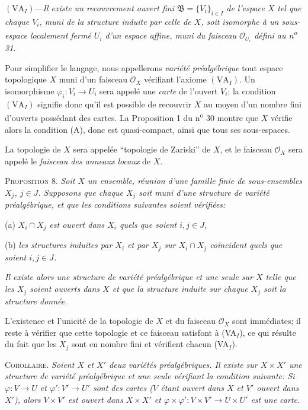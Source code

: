 $(\mathrm{VA}_I)$---\textit{Il existe un recouvrement ouvert fini $\mathfrak{B} = \{V_i\}_{i \in I}$ de l'espace $X$ tel que chaque $V_i$, muni de la structure induite par celle de $X$, soit isomorphe à un sous-espace localement fermé $U_i$ d'un espace affine, muni du faisceau $\mathcal{O}_{U_i}$ défini au n\textsuperscript{o} 31.}

Pour simplifier le langage, nous appellerons \textit{variété préalgébrique} tout espace topologique $X$ muni d'un faisceau $\mathcal{O}_X$ vérifiant l'axiome $(\mathrm{VA}_I)$. Un isomorphisme $\varphi_i\colon V_i \to U_i$ sera appelé une \textit{carte} de l'ouvert $V_i$; la condition $(\mathrm{VA}_I)$ signifie donc qu'il est possible de recouvrir $X$ au moyen d'un nombre fini d'ouverts possédant des cartes. La Proposition 1 du n\textsuperscript{o} 30 montre que $X$ vérifie alors la condition (A), donc est quasi-compact, ainsi que tous ses sous-espaces.



La topologie de $X$ sera appelée ``topologie de Zariski'' de $X$, et le faisceau $\mathcal{O}_X$ sera appelé le \textit{faisceau des anneaux locaux} de $X$.

\textsc{Proposition} 8. \textit{Soit $X$ un ensemble, réunion d'une famille finie de sous-ensembles $X_j$, $j \in J$. Supposons que chaque $X_j$ soit muni d'une structure de variété préalgébrique, et que les conditions suivantes soient vérifiées:}

(a) \textit{$X_i \cap X_j$ est ouvert dans $X_i$ quels que soient $i, j \in J$,}

(b) \textit{les structures induites par $X_i$ et par $X_j$ sur $X_i \cap X_j$ coïncident quels que soient $i, j \in J$.}

\textit{Il existe alors une structure de variété préalgébrique et une seule sur $X$ telle que les $X_j$ soient ouverts dans $X$ et que la structure induite sur chaque $X_j$ soit la structure donnée.}

L'existence et l'unicité de la topologie de $X$ et du faisceau $\mathcal{O}_X$ sont immédiates; il reste à vérifier que cette topologie et ce faisceau satisfont à (VA$_I$), ce qui résulte du fait que les $X_j$ sont en nombre fini et vérifient chacun (VA$_I$).

\textsc{Corollaire}. \textit{Soient $X$ et $X'$ deux variétés préalgébriques. Il existe sur $X \times X'$ une structure de variété préalgébrique et une seule vérifiant la condition suivante: Si $\varphi : V \to U$ et $\varphi' : V' \to U'$ sont des cartes ($V$ étant ouvert dans $X$ et $V'$ ouvert dans $X'$), alors $V \times V'$ est ouvert dans $X \times X'$ et $\varphi \times \varphi' : V \times V' \to U \times U'$ est une carte.}


